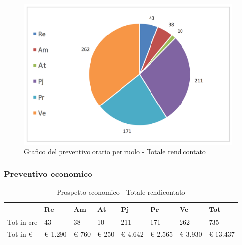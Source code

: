 							\begin{figure}[H]
							\centering
							\includegraphics[scale=0.40]{img/h_r_TotaleRendicontato}
							\caption{Grafico del preventivo orario per ruolo - Totale rendicontato}
							\label{fig:Totale rendicontato orario"}
							\end{figure}
				\newpage
				\subsubsection {Preventivo economico}
							\begin{table}[H] \begin{center} \begin{tabular}{llllllll}
							\toprule
								&	\textbf{Re}	&	\textbf{Am}	&	\textbf{At}	&	\textbf{Pj}	&	\textbf{Pr}	&	\textbf{Ve}	&	\textbf{Tot}\\

							\midrule
							Tot in ore	&	43	&	38	&	10	&	211	&	171	&	262	&	735	 \\


							Tot in €	&	 €  1.290 	 & 	 €      760 	 & 	 €     250 	 & 	 €  4.642 	 & 	 € 2.565 	 & 	 €  3.930 	 & 	 €  13.437 	 \\
							\bottomrule
							\end{tabular} \end{center} \caption{Prospetto economico -
							Totale rendicontato
							}\label{tab:s_TotaleRendicontato} \end{table}

